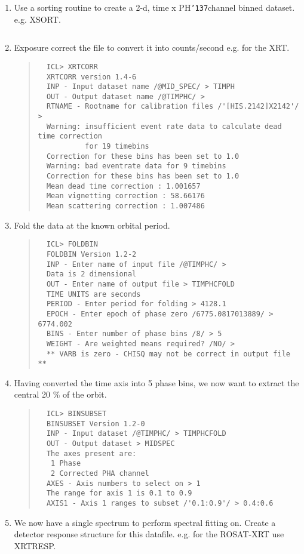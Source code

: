 \documentclass{book}
\renewcommand{\_}{{\tt\char'137}}     %
\begin{document}
 
\begin{enumerate}
\item Use a sorting routine to create a 2-d, time x PH\_channel
binned dataset. e.g. XSORT.
 
\begin{verbatim}
  \end{verbatim}
\item Exposure correct the file to convert it into counts/second
e.g. for the XRT.
 
\begin{quote}\begin{verbatim}
  ICL> XRTCORR
  XRTCORR version 1.4-6
  INP - Input dataset name /@MID_SPEC/ > TIMPH
  OUT - Output dataset name /@TIMPHC/ >
  RTNAME - Rootname for calibration files /'[HIS.2142]X2142'/ >
  Warning: insufficient event rate data to calculate dead time correction
           for 19 timebins
  Correction for these bins has been set to 1.0
  Warning: bad eventrate data for 9 timebins
  Correction for these bins has been set to 1.0
  Mean dead time correction : 1.001657
  Mean vignetting correction : 58.66176
  Mean scattering correction : 1.007486
  \end{verbatim}\end{quote}
\item Fold the data at the known orbital period.
 
\begin{quote}\begin{verbatim}
  ICL> FOLDBIN
  FOLDBIN Version 1.2-2
  INP - Enter name of input file /@TIMPHC/ >
  Data is 2 dimensional
  OUT - Enter name of output file > TIMPHCFOLD
  TIME UNITS are seconds
  PERIOD - Enter period for folding > 4128.1
  EPOCH - Enter epoch of phase zero /6775.0817013889/ > 6774.002
  BINS - Enter number of phase bins /8/ > 5
  WEIGHT - Are weighted means required? /NO/ >
  ** VARB is zero - CHISQ may not be correct in output file **
  \end{verbatim}\end{quote}
\item Having converted the time axis into 5 phase bins, we now want to
extract the central 20 \% of the orbit.
 
\begin{quote}\begin{verbatim}
  ICL> BINSUBSET
  BINSUBSET Version 1.2-0
  INP - Input dataset /@TIMPHC/ > TIMPHCFOLD
  OUT - Output dataset > MIDSPEC
  The axes present are:
   1 Phase
   2 Corrected PHA channel
  AXES - Axis numbers to select on > 1
  The range for axis 1 is 0.1 to 0.9
  AXIS1 - Axis 1 ranges to subset /'0.1:0.9'/ > 0.4:0.6
  \end{verbatim}\end{quote}
\item We now have a single spectrum to perform spectral fitting on.
Create a detector response structure for this datafile. e.g.
for the ROSAT-XRT use XRTRESP.
 

\end{enumerate}
\end{document}
